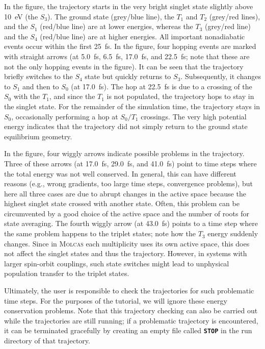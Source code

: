 \documentclass[a4paper,11pt,DIV=15,openany]{scrbook}
\newcommand{\ttt}[1]{\textbf{\texttt{#1}}}
\begin{document}
In the figure, the trajectory starts in the very bright singlet state slightly above 10~eV (the $S_3$).
The ground state (grey/blue line), the $T_1$ and $T_2$ (grey/red lines), and the $S_1$ (red/blue line) are at lower energies, whereas the $T_3$ (grey/red line) and the $S_4$ (red/blue line) are at higher energies.
All important nonadiabatic events occur within the first 25~fs.
In the figure, four hopping events are marked with straight arrows (at 5.0~fs, 6.5~fs, 17.0~fs, and 22.5~fs; note that these are not the only hopping events in the figure).
It can be seen that the trajectory briefly switches to the $S_4$ state but quickly returns to $S_3$.
Subsequently, it changes to $S_1$ and then to $S_0$ (at 17.0~fs).
The hop at 22.5~fs is due to a crossing of the $S_0$ with the $T_1$, and since the $T_1$ is not populated, the trajectory hops to stay in the singlet state.
For the remainder of the simulation time, the trajectory stays in $S_0$, occasionally performing a hop at $S_0/T_1$ crossings.
The very high potential energy indicates that the trajectory did not simply return to the ground state equilibrium geometry.

In the figure, four wiggly arrows indicate possible problems in the trajectory.
Three of these arrows (at 17.0~fs, 29.0~fs, and 41.0~fs) point to time steps where the total energy was not well conserved.
In general, this can have different reasons (e.g., wrong gradients, too large time steps, convergence problems), but here all three cases are due to abrupt changes in the active space because the highest singlet state crossed with another state.
Often, this problem can be circumvented by a good choice of the active space and the number of roots for state averaging.
The fourth wiggly arrow (at 43.0~fs) points to a time step where the same problem happens to the triplet states; note how the $T_3$ energy suddenly changes.
Since in \textsc{Molcas} each multiplicity uses its own active space, this does not affect the singlet states and thus the trajectory.
However, in systems with larger spin-orbit couplings, such state switches might lead to unphysical population transfer to the triplet states.

Ultimately, the user is responsible to check the trajectories for such problematic time steps.
For the purposes of the tutorial, we will ignore these energy conservation problems.
Note that this trajectory checking can also be carried out while the trajectories are still running; if a problematic trajectory is encountered, it can be terminated gracefully by creating an empty file called \ttt{STOP} in the run directory of that trajectory.
\end{document}

